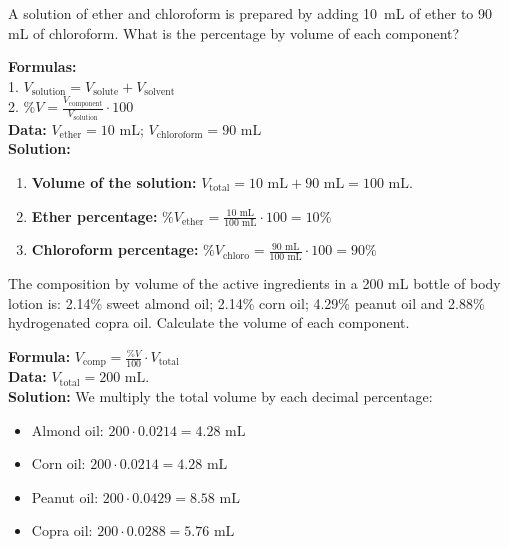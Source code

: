 \begin{exercise}
    A solution of ether and chloroform is prepared by adding \qty{10}{\mL} of ether to 90 mL of chloroform. What is the percentage by volume of each component?
    \begin{solu}
        \textbf{Formulas:} \\
        1. $V_{\text{solution}} = V_{\text{solute}} + V_{\text{solvent}}$ \\
        2. $\%V = \frac{V_{\text{component}}}{V_{\text{solution}}} \cdot 100$ \\

        \textbf{Data:} $V_{\text{ether}} = 10 \text{ mL}$; $V_{\text{chloroform}} = 90 \text{ mL}$ \\

        \textbf{Solution:}
        \begin{enumerate}
            \item \textbf{Volume of the solution:} $V_{\text{total}} = 10 \text{ mL} + 90 \text{ mL} = 100 \text{ mL}$.
            \item \textbf{Ether percentage:} $\%V_{\text{ether}} = \frac{10 \text{ mL}}{100 \text{ mL}} \cdot 100 = 10\%$
            \item \textbf{Chloroform percentage:} $\%V_{\text{chloro}} = \frac{90 \text{ mL}}{100 \text{ mL}} \cdot 100 = 90\%$
        \end{enumerate}
    \end{solu}
\end{exercise}

\begin{exercise}
    The composition by volume of the active ingredients in a 200 mL bottle of body lotion is: 2.14\% sweet almond oil; 2.14\% corn oil; 4.29\% peanut oil and 2.88\% hydrogenated copra oil. Calculate the volume of each component.
    \begin{solu}
        \textbf{Formula:} $V_{\text{comp}} = \frac{\%V}{100} \cdot V_{\text{total}}$ \\
        \textbf{Data:} $V_{\text{total}} = 200 \text{ mL}$. \\
        \textbf{Solution:} We multiply the total volume by each decimal percentage:
        \begin{itemize}
            \item Almond oil: $200 \cdot 0.0214 = 4.28 \text{ mL}$
            \item Corn oil: $200 \cdot 0.0214 = 4.28 \text{ mL}$
            \item Peanut oil: $200 \cdot 0.0429 = 8.58 \text{ mL}$
            \item Copra oil: $200 \cdot 0.0288 = 5.76 \text{ mL}$
        \end{itemize}
    \end{solu}
\end{exercise}


